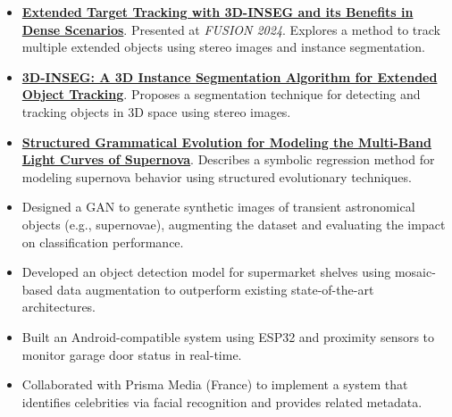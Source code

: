 \begin{itemize}
    \item \href{https://ieeexplore.ieee.org/document/10706460}{\textbf{Extended Target Tracking with 3D-INSEG and its Benefits in Dense Scenarios}}. Presented at \textit{FUSION 2024}. Explores a method to track multiple extended objects using stereo images and instance segmentation.
    
    \item \href{https://ieeexplore.ieee.org/document/10382343}{\textbf{3D-INSEG: A 3D Instance Segmentation Algorithm for Extended Object Tracking}}. Proposes a segmentation technique for detecting and tracking objects in 3D space using stereo images.
    
    \item \href{https://trilogia.utem.cl/articulos/structured-grammatical-evolution-for-modeling-the-multi-band-light-curves-of-supernova/}{\textbf{Structured Grammatical Evolution for Modeling the Multi-Band Light Curves of Supernova}}. Describes a symbolic regression method for modeling supernova behavior using structured evolutionary techniques.
\end{itemize}


\begin{itemize}
    \item Designed a GAN to generate synthetic images of transient astronomical objects (e.g., supernovae), augmenting the dataset and evaluating the impact on classification performance.
\end{itemize}

\begin{itemize}
    \item Developed an object detection model for supermarket shelves using mosaic-based data augmentation to outperform existing state-of-the-art architectures.
\end{itemize}

\begin{itemize}
    \item Built an Android-compatible system using ESP32 and proximity sensors to monitor garage door status in real-time.
\end{itemize}

\begin{itemize}
    \item Collaborated with Prisma Media (France) to implement a system that identifies celebrities via facial recognition and provides related metadata.
\end{itemize}

